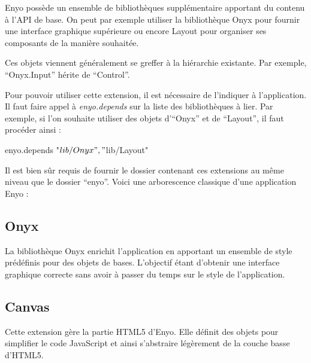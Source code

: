 \documentclass[11pt,a4paper]{report}
\begin{document}
Enyo possède un ensemble de bibliothèques supplémentaire apportant du contenu à l'API de base.
On peut par exemple utiliser la bibliothèque Onyx pour fournir une interface graphique 
supérieure ou encore Layout pour organiser ses composants de la manière souhaitée.

Ces objets viennent généralement se greffer à la hiérarchie existante. Par exemple,
``Onyx.Input'' hérite de ``Control''.

Pour pouvoir utiliser cette extension, il est nécessaire de l'indiquer à l'application.
Il faut faire appel à \emph{enyo.depends} sur la liste des bibliothèques à lier.
Par exemple, si l'on souhaite utiliser des objets d'``Onyx'' et de ``Layout'', il faut procéder ainsi :

\begin{JavaScript}
  enyo.depends{ "$lib/Onyx", "$lib/Layout"}
\end{JavaScript}

Il est bien sûr requis de fournir le dossier contenant ces extensions au même niveau que le dossier
``enyo''. Voici une arborescence classique d'une application Enyo :


\subsection{Onyx}

La bibliothèque Onyx enrichit l'application en apportant un ensemble de style prédéfinis pour 
des objets de bases. L'objectif étant d'obtenir une interface graphique correcte sans avoir
à passer du temps sur le style de l'application.

\subsection{Canvas}

Cette extension gère la partie HTML5 d'Enyo. Elle définit des objets pour simplifier le code JavaScript
et ainsi s'abstraire légèrement de la couche basse d'HTML5.
\end{document}
